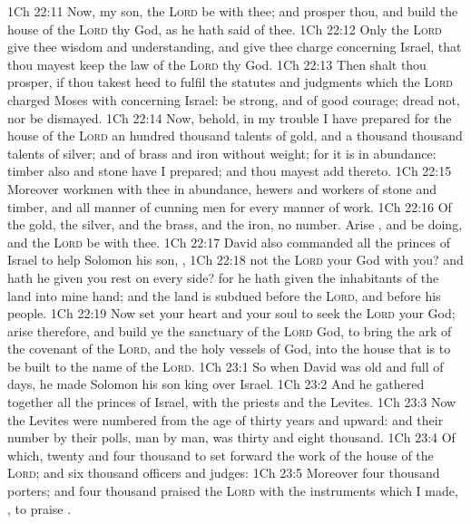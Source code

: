 \vs 1Ch 22:11 Now, my son, the \textsc{Lord} be with thee; and prosper thou, and build the house of the \textsc{Lord} thy God, as he hath said of thee.
\vs 1Ch 22:12 Only the \textsc{Lord} give thee wisdom and understanding, and give thee charge concerning Israel, that thou mayest keep the law of the \textsc{Lord} thy God.
\vs 1Ch 22:13 Then shalt thou prosper, if thou takest heed to fulfil the statutes and judgments which the \textsc{Lord} charged Moses with concerning Israel: be strong, and of good courage; dread not, nor be dismayed.
\vs 1Ch 22:14 Now, behold, in my trouble I have prepared for the house of the \textsc{Lord} an hundred thousand talents of gold, and a thousand thousand talents of silver; and of brass and iron without weight; for it is in abundance: timber also and stone have I prepared; and thou mayest add thereto.
\vs 1Ch 22:15 Moreover  workmen with thee in abundance, hewers and workers of stone and timber, and all manner of cunning men for every manner of work.
\vs 1Ch 22:16 Of the gold, the silver, and the brass, and the iron,  no number. Arise , and be doing, and the \textsc{Lord} be with thee.
\vs 1Ch 22:17 David also commanded all the princes of Israel to help Solomon his son, ,
\vs 1Ch 22:18  not the \textsc{Lord} your God with you? and hath he  given you rest on every side? for he hath given the inhabitants of the land into mine hand; and the land is subdued before the \textsc{Lord}, and before his people.
\vs 1Ch 22:19 Now set your heart and your soul to seek the \textsc{Lord} your God; arise therefore, and build ye the sanctuary of the \textsc{Lord} God, to bring the ark of the covenant of the \textsc{Lord}, and the holy vessels of God, into the house that is to be built to the name of the \textsc{Lord}.
\vs 1Ch 23:1 So when David was old and full of days, he made Solomon his son king over Israel.
\vs 1Ch 23:2 And he gathered together all the princes of Israel, with the priests and the Levites.
\vs 1Ch 23:3 Now the Levites were numbered from the age of thirty years and upward: and their number by their polls, man by man, was thirty and eight thousand.
\vs 1Ch 23:4 Of which, twenty and four thousand  to set forward the work of the house of the \textsc{Lord}; and six thousand  officers and judges:
\vs 1Ch 23:5 Moreover four thousand  porters; and four thousand praised the \textsc{Lord} with the instruments which I made, , to praise .
